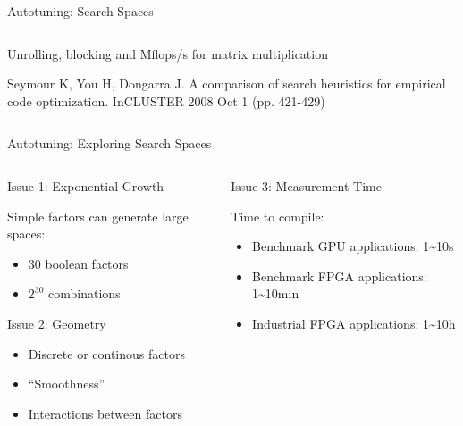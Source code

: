 \documentclass[10pt, compress, aspectratio=169, xcolor={table,usenames,dvipsnames}]{beamer}
\begin{document}
\begin{frame}[label={sec:org899ddda}]{Autotuning: Search Spaces}
\begin{columns}
\begin{column}{0.6\columnwidth}
\begin{center}
\alert{Unrolling}, \alert{blocking} and \alert{Mflops/s} for \alert{matrix multiplication}

\vspace{.1cm}

\scriptsize{Seymour K, You H, Dongarra J. A comparison of search heuristics for empirical code optimization. InCLUSTER 2008 Oct 1 (pp. 421-429)}
\end{center}
\end{column}
\end{columns}
\end{frame}

\begin{frame}[label={sec:org4c2515c}]{Autotuning: Exploring Search Spaces}
\begin{columns}
\begin{column}{0.5\columnwidth}
\begin{block}{Issue 1: \alert{Exponential Growth}}
\vspace{.2cm}

\alert{Simple factors} can generate \alert{large spaces}:

\begin{itemize}
\item 30 \alert{boolean} factors
\item \(2^{30}\) combinations
\end{itemize}

\begin{block}{Issue 2: \alert{Geometry}}
\begin{itemize}
\item \alert{Discrete} or \alert{continous} factors
\item \alert{``Smoothness''}
\item \alert{Interactions} between factors
\end{itemize}
\end{block}
\end{block}
\end{column}

\begin{column}{0.5\columnwidth}
\begin{block}{Issue 3: \alert{Measurement Time}}
\vspace{.2cm}

Time to \alert{compile}:

\begin{itemize}
\item \alert{Benchmark} GPU applications: \alert{1\textasciitilde{}10s}
\item \alert{Benchmark} FPGA applications: \alert{1\textasciitilde{}10min}
\item \alert{Industrial} FPGA applications: \alert{1\textasciitilde{}10h}
\end{itemize}
\end{block}
\end{column}
\end{columns}
\end{frame}
\end{document}
